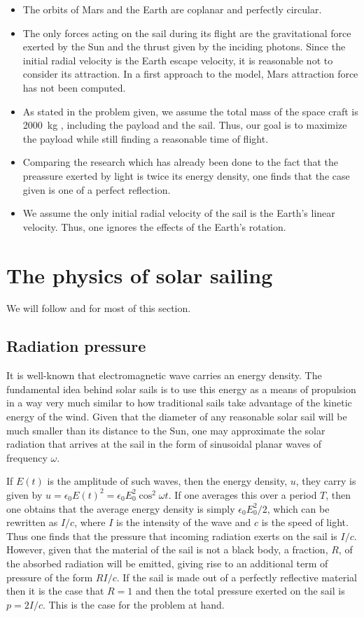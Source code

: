 \documentclass[twocolumn,12pt,a4paper]{article}
\numberwithin{equation}{section}
\begin{document}
\begin{itemize}
\item The orbits of Mars and the Earth are coplanar and perfectly circular.
\item The only forces acting on the sail during its flight are the gravitational force exerted by the Sun and the thrust given by the inciding photons. Since the initial radial velocity is the Earth escape velocity, it is reasonable not to consider its attraction. In a first approach to the model, Mars attraction force has not been computed.
\item As stated in the problem given, we assume the total mass of the space craft is \SI{2 000}{kg} , including the payload and the sail. Thus, our goal is to maximize the payload while still finding a reasonable time of flight. 
\item Comparing the research which has already been done to the fact that the preassure exerted by light is twice its energy density, one finds that the case given is one of a perfect reflection.
\item We assume the only initial radial velocity of the sail is the Earth's linear velocity. Thus, one ignores the effects of the Earth's rotation.
\end{itemize}


\section{The physics of solar sailing}
We will follow \cite{tsu} and \cite{mcinnes} for most of this section.
\subsection{Radiation pressure}
It is well-known that electromagnetic wave carries an energy density. The fundamental idea behind solar sails is to use this energy as a means of propulsion in a way very much similar to how traditional sails take advantage of the kinetic energy of the wind. Given that the diameter of any reasonable solar sail will be much smaller than its distance to the Sun, one may approximate the solar radiation that arrives at the sail in the form of sinusoidal planar waves of frequency \( \omega \).

If \( E(t) \) is the amplitude of such waves, then the energy density, \( u \), they carry is given by \( u = \epsilon_0 E(t)^2 = \epsilon_0 E_0^2 \cos^2{\omega t} \). If one averages this over a period \( T \), then one obtains that the average energy density is simply \( \epsilon_0 E_0^2 /2 \), which can be rewritten as \( I/c \), where \( I \) is the intensity of the wave and \( c \) is the speed of light. Thus one finds that the pressure that incoming radiation exerts on the sail is \( I/c \). However, given that the material of the sail is not a black body, a fraction, \( R \), of the absorbed radiation will be emitted, giving rise to an additional term of pressure of the form \( RI/c \). If the sail is made out of a perfectly reflective material then it is the case that \( R = 1 \) and then the total pressure exerted on the sail is \( p = 2I/c \). This is the case for the problem at hand.
\end{document}
